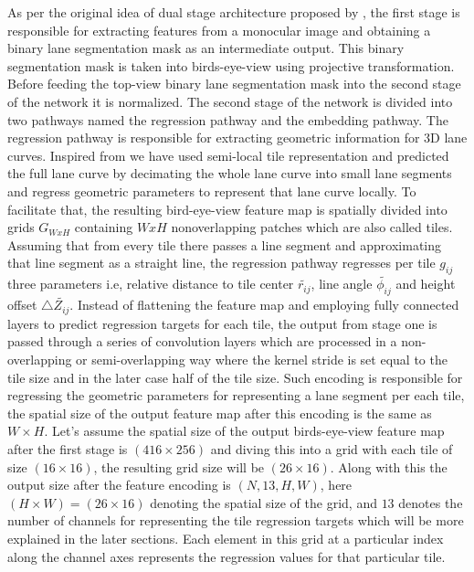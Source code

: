      As per the original idea of dual stage architecture proposed by \cite{guo2020gen}, the first stage is responsible for extracting features from a monocular image and obtaining a binary lane segmentation mask as an intermediate output. This binary segmentation mask is taken into birds-eye-view using projective transformation. Before feeding the top-view binary lane segmentation mask into the second stage of the network it is normalized. The second stage of the network is divided into two pathways named the regression pathway and the embedding pathway. The regression pathway is responsible for extracting geometric information for 3D lane curves. Inspired from \cite{DBLP:journals/corr/abs-2011-01535} we have used semi-local tile representation and predicted the full lane curve by decimating the whole lane curve into small lane segments and regress geometric parameters to represent that lane curve locally. To facilitate that, the resulting bird-eye-view \cite{DBLP:journals/corr/abs-2011-01535} feature map is spatially divided into grids $G_{WxH}$ containing $WxH$ nonoverlapping patches which are also called tiles. Assuming that from every tile there passes a line segment and approximating that line segment as a straight line, the regression pathway \cite{DBLP:journals/corr/abs-2011-01535}regresses per tile $g_{ij}$ three parameters i.e, relative distance to tile center $\widetilde{r_{ij}}$, line angle $\widetilde{\phi_{ij}}$ and height offset $\triangle \widetilde{Z_{ij}}$. Instead of flattening the feature map and employing fully connected layers to predict regression targets for each tile, the output from stage one is passed through a series of convolution layers which are processed in a non-overlapping or semi-overlapping way where the kernel stride is set equal to the tile size and in the later case half of the tile size. Such encoding is responsible for regressing the geometric parameters for representing a lane segment per each tile, the spatial size of the output feature map after this encoding is the same as $W \times H$. Let's assume the spatial size of the output birds-eye-view feature map after the first stage is $(416 \times 256)$ and diving this into a grid with each tile of size $(16 \times 16)$, the resulting grid size will be $(26 \times 16)$. Along with this the output size after the feature encoding is $(N, 13, H, W)$, here $(H\times W) = (26 \times 16)$ denoting the spatial size of the grid, and $13$ denotes the number of channels for representing the tile regression targets which will be more explained in the later sections. Each element in this grid at a particular index along the channel axes represents the regression values for that particular tile.
     

